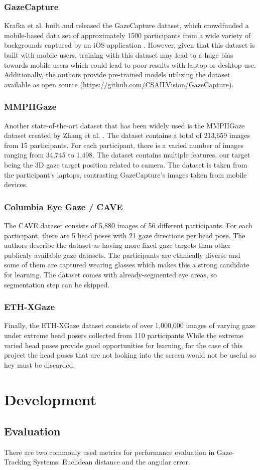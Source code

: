 \subsection{GazeCapture}
Krafka et al. built and released the GazeCapture dataset, which crowdfunded a mobile-based data set of approximately 1500 participants from a wide variety of backgrounds captured by an iOS application \cite{GazeCapture}. However, given that this dataset is built with mobile users, training with this dataset may lead to a huge bias towards mobile users which could lead to poor results with laptop or desktop use.
Additionally, the authors provide pre-trained models utilizing the dataset available as open source (\url{https://github.com/CSAILVision/GazeCapture}).

\subsection{MMPIIGaze}
Another state-of-the-art dataset that has been widely used is the MMPIIGaze dataset created by Zhang et al. \cite{GazeEstimationInTheWild}.
The dataset contains a total of 213,659 images from 15 participants. For each participant, there is a varied number of
images ranging from 34,745 to 1,498. The dataset contains multiple features, our target being the 3D gaze target position related to camera.
The dataset is taken from the participant's laptops, contrasting GazeCapture's images taken from mobile devices.

\subsection{Columbia Eye Gaze / CAVE}
The CAVE dataset \cite{CAVE_0324} consists of 5,880 images of 56 different participants. For each participant, there are 5 head poses with 21 gaze directions per head pose. The authors describe the dataset as having more fixed gaze targets than other publicaly available gaze datasets. The participants are ethnically diverse and some of them are captured wearing glasses which makes this a strong candidate for learning. The dataset comes with already-segmented eye areas, so segmentation step can be skipped.

\subsection{ETH-XGaze}
Finally, the ETH-XGaze dataset \cite{Zhang2020ETHXGaze} consists of over 1,000,000 images of varying gaze under extreme head posers collected from 110 participants While the extreme varied head poses provide good opportunities for learning, for the case of this project the head poses that are not looking into the screen would not be useful so hey must be discarded.


\chapter{Development}
\label{Chap3}

\section{Evaluation}
There are two commonly used metrics for performance evaluation in Gaze-Tracking Systems:
Euclidean distance and the angular error.